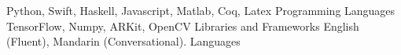 \begin{cventries}
  \cvsmallentry
    {Python, Swift, Haskell, Javascript, Matlab, Coq, Latex}
    {Programming Languages}
    {}
    {}
    {}
  \cvsmallentry
    {TensorFlow, Numpy, ARKit, OpenCV}
    {Libraries and Frameworks}
    {}
    {}
    {}
  \cvsmallentry
    {English (Fluent), Mandarin (Conversational).}
    {Languages}
    {}
    {}
    {}
\end{cventries}


